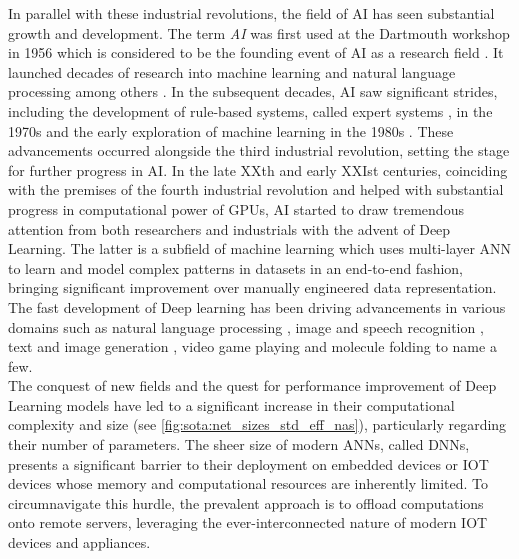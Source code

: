 In parallel with these industrial revolutions, the field of \ac{AI} has seen
substantial growth and development. The term \emph{\acl{AI}} was first used at
the Dartmouth workshop in 1956 which is considered to be the founding event of
\ac{AI} as a research field \cite{dartmouth1956}. It launched decades of
research into machine learning and natural language processing among others
\cite{nilsson1998artificial}. In the subsequent decades, \ac{AI} saw significant
strides, including the development of rule-based systems, called expert systems
\cite{giarratano1994expert}, in the 1970s and the early exploration of machine
learning in the 1980s \cite{rumelhart1986learning}. These advancements occurred
alongside the third industrial revolution, setting the stage for further
progress in \ac{AI}. In the late XXth and early XXIst centuries, coinciding with
the premises of the fourth industrial revolution and helped with substantial
progress in computational power of \acp{GPU}, \ac{AI} started to draw tremendous
attention from both researchers and industrials with the advent of Deep
Learning. The latter is a subfield of machine learning which uses multi-layer
\ac{ANN} to learn and model complex patterns in datasets in an end-to-end
fashion, bringing significant improvement over manually engineered data
representation. The fast development of Deep learning has been driving advancements
in various domains such as natural language processing
\cite{DBLP:conf/emnlp/BudzianowskiV19,DBLP:conf/naacl/DevlinCLT19,DBLP:conf/nips/VaswaniSPUJGKP17},
image and speech recognition
\cite{DBLP:conf/nips/KrizhevskySH12,DBLP:journals/corr/SimonyanZ14a,DBLP:conf/cvpr/HeZRS16,DBLP:journals/corr/HannunCCCDEPSSCN14,DBLP:conf/icassp/ChanJLV16,DBLP:conf/icml/AmodeiABCCCCCCD16},
text and image generation
\cite{goodfellow2020generative,karras2019style,DBLP:conf/emnlp/BudzianowskiV19},
video game playing \cite{silver2016mastering,silver2018general} and molecule
folding \cite{jumper2021highly} to name a few.\\


The conquest of new fields and the quest for performance improvement of Deep
Learning models have led to a significant increase in their computational
complexity and size (see \cref{fig:sota:net_sizes_std_eff_nas}), particularly
regarding their number of parameters. The sheer size of modern \acp{ANN}, called
\acp{DNN}, presents a significant barrier to their deployment on embedded
devices or \ac{IOT} devices whose memory and computational resources are
inherently limited. To circumnavigate this hurdle, the prevalent approach is to
offload computations onto remote servers, leveraging the ever-interconnected
nature of modern \ac{IOT} devices and appliances.\\

